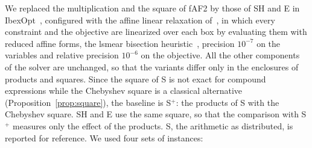 \documentclass[11pt]{article}
\theoremstyle{definition}
\begin{document}
We replaced the multiplication and the square of fAF2 by those of SH and E in IbexOpt~\cite{chabert2009}, configured with the affine linear relaxation of~\cite{ninin2015reliable}, in which every constraint and the objective are linearized over each box by evaluating them with reduced affine forms, the lsmear bisection heuristic~\cite{araya2017}, precision $10^{-7}$ on the variables and relative precision $10^{-6}$ on the objective. All the other components of the solver are unchanged, so that the variants differ only in the enclosures of products and squares. Since the square of S is not exact for compound expressions while the Chebyshev square is a classical alternative (Proposition~\ref{prop:square}), the baseline is S$^+$: the products of S with the Chebyshev square. SH and E use the same square, so that the comparison with S$^+$ measures only the effect of the products. S, the arithmetic as distributed, is reported for reference. We used four sets of instances:
\end{document}
